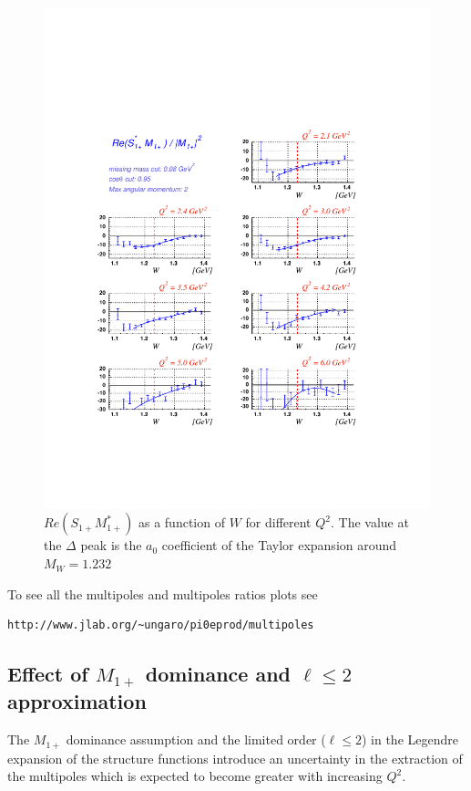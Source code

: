 \begin{figure}[h]
 \begin{center}
 \includegraphics[width = 13cm, bb=30 130 550 600]{analysis/img/multism_taylor} 
  \caption[ $Re(S_{1+}M_{1+}^*)$ as a function of $W$ for different $Q^2$.]
{ $Re(S_{1+}M_{1+}^*)$ as a function of $W$ for different $Q^2$. The value at the $\Delta $ peak
is the $a_0$ coefficient of the Taylor expansion around $M_W = 1.232$}
 \label{fig:multism_taylor}
 \end{center}
\end{figure}
To see all the multipoles and multipoles ratios plots see
\begin{verbatim} 
http://www.jlab.org/~ungaro/pi0eprod/multipoles
\end{verbatim}



\subsection{ Effect of $M_{1+}$ dominance and $\ell \le 2$ approximation}
\label{sec:m1pdomeffect}
The $M_{1+}$ dominance assumption and
the limited order ($\ell \le 2$) in the Legendre expansion of the structure functions
introduce an uncertainty in the extraction of the multipoles which is expected to 
become greater with increasing $Q^2$.

